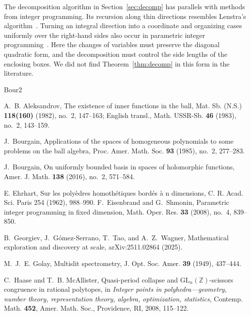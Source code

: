 \documentclass[a4paper,reqno,12pt]{amsart}
\theoremstyle{plain}
\theoremstyle{plain}
\theoremstyle{remark}
\theoremstyle{plain}
\theoremstyle{plain}
\theoremstyle{plain}
\begin{document}
{The decomposition algorithm in Section~\ref{sec:decomp} has parallels
with methods from integer programming. Its recursion
along thin directions resembles Lenstra's algorithm~\cite{Len}.
Turning an integral direction into a coordinate and organizing cases
uniformly over the right-hand sides also occur in parametric integer
programming~\cite{Kan92,ES08}. Here the changes of variables must preserve
the diagonal quadratic form, and the decomposition must control the
side lengths of the enclosing boxes. We did not find
Theorem~\ref{thm:decomp} in this form in the literature.

\begin{thebibliography}{Bour2}

{
A.~B. Aleksandrov,
The existence of inner functions in the ball,
Mat. Sb. (N.S.) \textbf{118(160)} (1982), no.~2, 147--163;
English transl., Math. USSR-Sb. \textbf{46} (1983), no.~2, 143--159.
}


J.~Bourgain,
Applications of the spaces of homogeneous polynomials to some problems
on the ball algebra, Proc. Amer. Math. Soc. \textbf{93} (1985), no.~2,
277--283.

J.~Bourgain, On uniformly bounded basis in spaces of holomorphic
functions, Amer. J. Math. \textbf{138} (2016), no.~2, 571--584.


 

E. Ehrhart, Sur les polyèdres homothétiques bordés à n dimensions, C. R. Acad. Sci.
Paris 254 (1962), 988--990.
F.~Eisenbrand and G.~Shmonin,
Parametric integer programming in fixed dimension,
Math. Oper. Res. \textbf{33} (2008), no.~4, 839--850.

B.~Georgiev, J.~G\'omez-Serrano, T.~Tao, and A.~Z.~Wagner,
Mathematical exploration and discovery at scale,
arXiv:2511.02864 (2025).

{
M.~J.~E. Golay,
Multislit spectrometry,
J. Opt. Soc. Amer. \textbf{39} (1949), 437--444.
}

C.~Haase and T.~B. McAllister,
Quasi-period collapse and $\mathrm{GL}_n(\mathbb Z)$-scissors congruence
in rational polytopes, in \emph{Integer points in polyhedra---geometry,
number theory, representation theory, algebra, optimization, statistics},
Contemp. Math. \textbf{452}, Amer. Math. Soc., Providence, RI, 2008,
115--122.


\end{thebibliography}}
\end{document}
